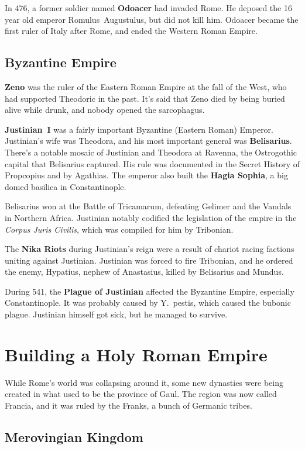In 476, a former soldier named \textbf{Odoacer} had invaded Rome.
He deposed the 16 year old emperor Romulus~Augustulus, but did not kill him.
Odoacer became the first ruler of Italy after Rome, and ended the Western Roman Empire.

\subsection*{Byzantine Empire}

\textbf{Zeno} was the ruler of the Eastern Roman Empire at the fall of the West,
who had supported Theodoric in the past.
It's said that Zeno died by being buried alive while drunk, and nobody opened the sarcophagus.

\textbf{Justinian~I} was a fairly important Byzantine (Eastern Roman) Emperor.
Justinian's wife was Theodora, and his most important general was \textbf{Belisarius}.
There's a notable mosaic of Justinian and Theodora at Ravenna,
the Ostrogothic capital that Belisarius captured.
His rule was documented in the Secret History of Propcopius and by Agathias.
The emperor also built the \textbf{Hagia Sophia}, a big domed basilica in Constantinople.

Belisarius won at the Battle of Tricamarum, defeating Gelimer and the Vandals in Northern Africa.
Justinian notably codified the legislation of the empire in the \textit{Corpus Juris Civilis},
which was compiled for him by Tribonian.

The \textbf{Nika Riots} during Justinian's reign were a result of chariot racing factions uniting against Justinian.
Justinian was forced to fire Tribonian,
and he ordered the enemy, Hypatius, nephew of Anastasius, killed by Belisarius and Mundus.

During 541, the \textbf{Plague of Justinian} affected the Byzantine Empire, especially Constantinople.
It was probably caused by Y.\ pestis, which caused the bubonic plague.
Justinian himself got sick, but he managed to survive.

\section{Building a Holy Roman Empire}

While Rome's world was collapsing around it, some new dynasties were being created
in what used to be the province of Gaul.
The region was now called Francia, and it was ruled by the Franks, a bunch of Germanic tribes.

\subsection*{Merovingian Kingdom}

